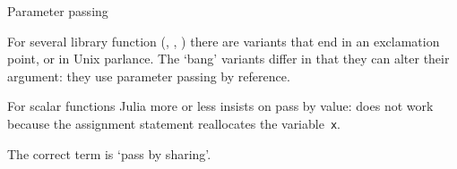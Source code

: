  {Parameter passing}

For several library function (, , )
there are variants that end in an exclamation point, or 
in Unix parlance. The `bang' variants differ in that they can alter their
argument: they use parameter passing by reference.


For scalar functions Julia more or less insists on pass by value:
%
%
does not work because the assignment statement reallocates the variable~\lstinline{x}.

The correct term is `pass by sharing'.



